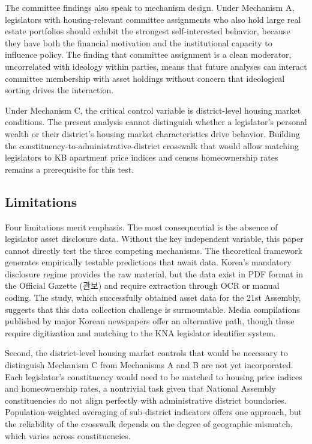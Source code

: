 \documentclass[11pt]{article}
\begin{document}
The committee findings also speak to mechanism design. Under Mechanism A, legislators with housing-relevant committee assignments who also hold large real estate portfolios should exhibit the strongest self-interested behavior, because they have both the financial motivation and the institutional capacity to influence policy. The finding that committee assignment is a clean moderator, uncorrelated with ideology within parties, means that future analyses can interact committee membership with asset holdings without concern that ideological sorting drives the interaction.

Under Mechanism C, the critical control variable is district-level housing market conditions. The present analysis cannot distinguish whether a legislator's personal wealth or their district's housing market characteristics drive behavior. Building the constituency-to-administrative-district crosswalk that would allow matching legislators to KB apartment price indices and census homeownership rates remains a prerequisite for this test.

\subsection{Limitations}

Four limitations merit emphasis. The most consequential is the absence of legislator asset disclosure data. Without the key independent variable, this paper cannot directly test the three competing mechanisms. The theoretical framework generates empirically testable predictions that await data. Korea's mandatory disclosure regime provides the raw material, but the data exist in PDF format in the Official Gazette (관보) and require extraction through OCR or manual coding. The \citet{seo2025} study, which successfully obtained asset data for the 21st Assembly, suggests that this data collection challenge is surmountable. Media compilations published by major Korean newspapers offer an alternative path, though these require digitization and matching to the KNA legislator identifier system.

Second, the district-level housing market controls that would be necessary to distinguish Mechanism C from Mechanisms A and B are not yet incorporated. Each legislator's constituency would need to be matched to housing price indices and homeownership rates, a nontrivial task given that National Assembly constituencies do not align perfectly with administrative district boundaries. Population-weighted averaging of sub-district indicators offers one approach, but the reliability of the crosswalk depends on the degree of geographic mismatch, which varies across constituencies.
\end{document}
